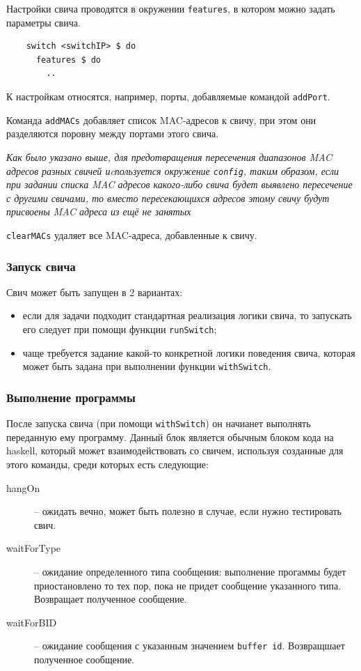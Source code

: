 \documentclass[9pt,a4paper]{article}
\begin{document}
Настройки свича проводятся в окружении \lstinline!features!, в котором можно
задать параметры свича.

\begin{lstlisting}
    switch <switchIP> $ do
      features $ do
        ..
\end{lstlisting}

К настройкам относятся, например, порты, добавляемые командой
\lstinline!addPort!.

Команда \lstinline!addMACs! добавляет список MAC-адресов к свичу, при этом они
разделяются поровну между портами этого свича.

\emph{Как было указано выше, для предотвращения пересечения диапазонов
  MAC адресов разных свичей иcпользуется окружение \lstinline!config!,
  таким образом, если при задании списка MAC адресов какого-либо свича
  будет выявлено пересечение с другими свичами, то вместо
  пересекающихся адресов этому свичу будут присвоены MAC адреса из ещё
  не занятых}

\lstinline!clearMACs! удаляет все MAC-адреса, добавленные к свичу.


\subsubsection{Запуск свича}

Свич может быть запущен в 2 вариантах:

\begin{itemize}
  \item если для задачи подходит стандартная реализация логики свича, то
    запускать его следует при помощи функции \lstinline!runSwitch!;
  \item чаще требуется задание какой-то конкретной логики поведения свича,
    которая может быть задана при выполнении функции \lstinline!withSwitch!.
\end{itemize}


\subsubsection{Выполнение программы}
После запуска свича (при помощи \lstinline!withSwitch!) он начианет выполнять
переданную ему программу. Данный блок является обычным блоком кода на haskell,
который может взаимодействовать со свичем, используя созданные для этого
команды, среди которых есть следующие:

\begin{description}
  \item[hangOn] -- ожидать вечно, может быть полезно в случае, если нужно
    тестировать свич.

  \item[waitForType] -- ожидание определенного типа сообщения: выполнение
    прогаммы будет приостановлено то тех пор, пока не придет сообщение
    указанного типа. Возвращает полученное сообщение.

  \item[waitForBID] -- ожидание сообщения с указанным значением
    \lstinline!buffer id!.  Возвращшает полученное сообщение.

\end{description}
\end{document}
